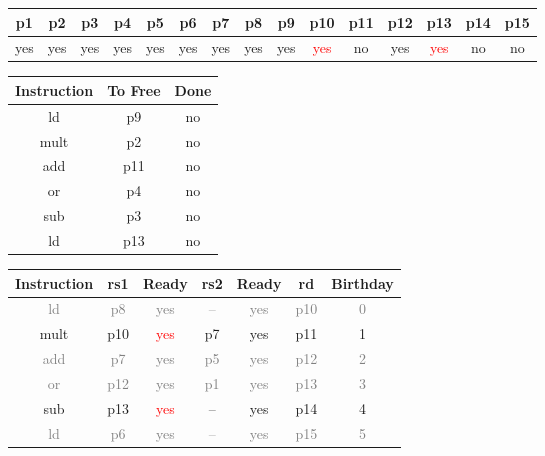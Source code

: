 \documentclass[12pt]{article}
\begin{document}
\begin{enumerate}
\begin{table}[H]
\begin{tabular}{|c|c|c|c|c|c|c|c|c|}
					\hline
				\end{tabular}
			\end{table}
			\begin{table}[H]
				\begin{tabular}{|c|c|c|c|c|c|c|c|c|c|c|c|c|c|c|}
					\hline
					p1 & p2 & p3 & p4 & p5 & p6 & p7 & p8 & p9 & p10 & p11 & p12 & p13 & p14 & p15\\
					\hline
					yes & yes & yes & yes & yes & yes & yes & yes & yes & \textcolor{red}{yes} & no & yes & \textcolor{red}{yes} & no & no\\
					\hline
				\end{tabular}
			\end{table}
			\begin{table}[H]
				\begin{tabular}{|c|c|c|}
					\hline
					Instruction & To Free & Done\\
					\hline
					ld & p9 & no\\
					\hline
					mult & p2 & no\\
					\hline
					add & p11 & no\\
					\hline
					or & p4 & no\\
					\hline
					sub & p3 & no\\
					\hline
					ld & p13 & no\\
					\hline
				\end{tabular}
				\hfill
				\begin{tabular}{|c|c|c|c|c|c|c|}
					\hline
					Instruction & rs1 & Ready & rs2 & Ready & rd & Birthday\\
					\hline
					\textcolor{gray}{ld} & \textcolor{gray}{p8} & \textcolor{gray}{yes} & \textcolor{gray}{--} & \textcolor{gray}{yes} & \textcolor{gray}{p10} & \textcolor{gray}{0}\\
					\hline
					mult & p10 & \textcolor{red}{yes} & p7 & yes & p11 & 1\\
					\hline
					\textcolor{gray}{add} & \textcolor{gray}{p7} & \textcolor{gray}{yes} & \textcolor{gray}{p5} & \textcolor{gray}{yes} & \textcolor{gray}{p12} & \textcolor{gray}{2}\\
					\hline
					\textcolor{gray}{or} & \textcolor{gray}{p12} & \textcolor{gray}{yes} & \textcolor{gray}{p1} & \textcolor{gray}{yes} & \textcolor{gray}{p13} & \textcolor{gray}{3}\\
					\hline
					sub & p13 & \textcolor{red}{yes} & -- & yes & p14 & 4\\
					\hline
					\textcolor{gray}{ld} & \textcolor{gray}{p6} & \textcolor{gray}{yes} & \textcolor{gray}{--} & \textcolor{gray}{yes} & \textcolor{gray}{p15} & \textcolor{gray}{5}\\

\end{tabular}
\end{table}
\end{enumerate}
\end{document}
